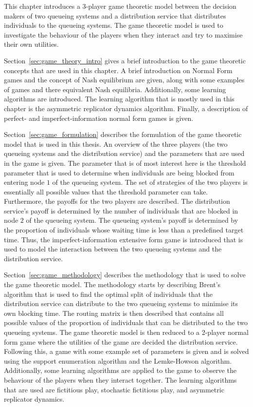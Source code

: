 This chapter introduces a 3-player game theoretic model between the decision 
makers of two queueing systems and a distribution service that distributes
individuals to the queueing systems.
The game theoretic model is used to investigate the behaviour of the players
when they interact and try to maximise their own utilities.

Section~\ref{sec:game_theory_intro} gives a brief introduction to the game
theoretic concepts that are used in this chapter.
A brief introduction on Normal Form games and the concept of Nash equilibrium
are given, along with some examples of games and there equivalent Nash
equilibria.
Additionally, some learning algorithms are introduced.
The learning algorithm that is mostly used in this chapter is the
asymmetric replicator dynamics algorithm.
Finally, a description of perfect- and imperfect-information normal form games
is given.

Section~\ref{sec:game_formulation} describes the formulation of the game
theoretic model that is used in this thesis.
An overview of the three players (the two queueing systems and the
distribution service) and the parameters that are used in the game is given.
The parameter that is of most interest here is the threshold parameter that
is used to determine when individuals are being blocked from entering node
\(1\) of the queueing system.
The set of strategies of the two players is essentially all possible values
that the threshold parameter can take.
Furthermore, the payoffs for the two players are described.
The distribution service's payoff is determined by the number of individuals
that are blocked in node \(2\) of the queueing system.
The queueing system's payoff is determined by the proportion of individuals
whose waiting time is less than a predefined target time.
Thus, the imperfect-information extensive form game is introduced that is
used to model the interaction between the two queueing systems and the
distribution service.

Section~\ref{sec:game_methodology} describes the methodology that is used to
solve the game theoretic model.
The methodology starts by describing Brent's algorithm that is used to find
the optimal split of individuals that the distribution service can distribute
to the two queueing systems to minimise its own blocking time.
The routing matrix is then described that contains all possible values of the
proportion of individuals that can be distributed to the two queueing systems.
The game theoretic model is then reduced to a 2-player normal form game where
the utilities of the game are decided the distribution service.
Following this, a game with some example set of parameters is given and
is solved using the support enumeration algorithm and the Lemke-Howson
algorithm.
Additionally, some learning algorithms are applied to the game to observe
the behaviour of the players when they interact together.
The learning algorithms that are used are fictitious play, stochastic
fictitious play, and asymmetric replicator dynamics.


